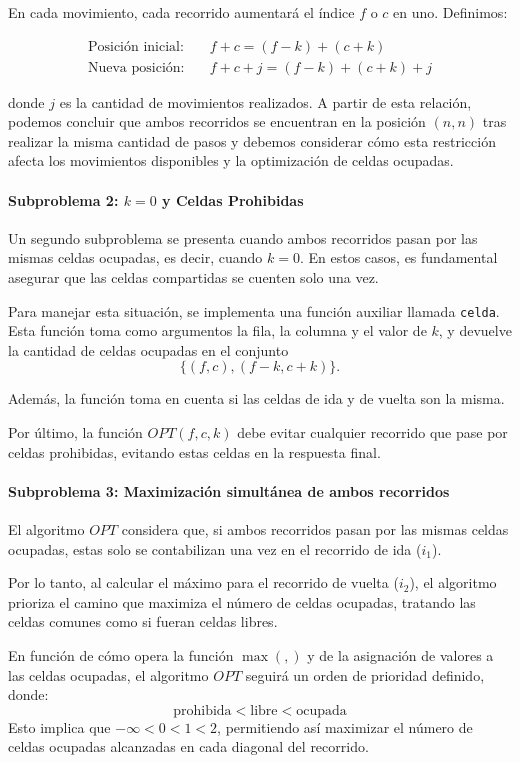 En cada movimiento, cada recorrido aumentará el índice $f$ o $c$ en uno. Definimos:

\begin{align*}
\text{Posición inicial:} & \quad f + c = (f - k) + (c + k) \\
\text{Nueva posición:} & \quad f + c + j = (f - k) + (c + k) + j
\end{align*}

donde $j$ es la cantidad de movimientos realizados. A partir de esta relación, podemos 
concluir que ambos recorridos se encuentran en la posición $(n, n)$ tras realizar la misma 
cantidad de pasos y debemos considerar cómo esta restricción afecta 
los movimientos disponibles y la optimización de celdas ocupadas.

\paragraph{Subproblema 2: $k = 0$ y Celdas Prohibidas}
Un segundo subproblema se presenta cuando ambos recorridos pasan por las mismas celdas ocupadas, es decir, 
cuando $k = 0$. En estos casos, es fundamental asegurar que las celdas compartidas se cuenten solo una vez.

Para manejar esta situación, se implementa una función auxiliar llamada \texttt{celda}. 
Esta función toma como argumentos la fila, la columna y el valor de $k$, y 
devuelve la cantidad de celdas ocupadas en el conjunto 
\[
\{(f, c), (f - k, c + k)\}.
\]

Además, la función toma en cuenta si las celdas de ida y de vuelta son la misma.

Por último, la función $OPT(f, c, k)$ debe evitar cualquier recorrido que pase por celdas prohibidas, 
evitando estas celdas en la respuesta final.

\paragraph{Subproblema 3: Maximización simultánea de ambos recorridos}

El algoritmo $OPT$ considera que, si ambos recorridos pasan por las mismas celdas ocupadas, 
estas solo se contabilizan una vez en el recorrido de ida ($i_1$). 

Por lo tanto, al calcular el máximo para el recorrido de vuelta ($i_2$), 
el algoritmo prioriza el camino que maximiza el número de celdas ocupadas, 
tratando las celdas comunes como si fueran celdas libres.

En función de cómo opera la función $\max(,)$ y de la asignación de valores a las celdas ocupadas, 
el algoritmo $OPT$ seguirá un orden de prioridad definido, donde:
\[
\text{prohibida} < \text{libre} < \text{ocupada}
\]
Esto implica que $-\infty < 0 < 1 < 2$, permitiendo así maximizar el número de celdas ocupadas alcanzadas en 
cada diagonal del recorrido.
